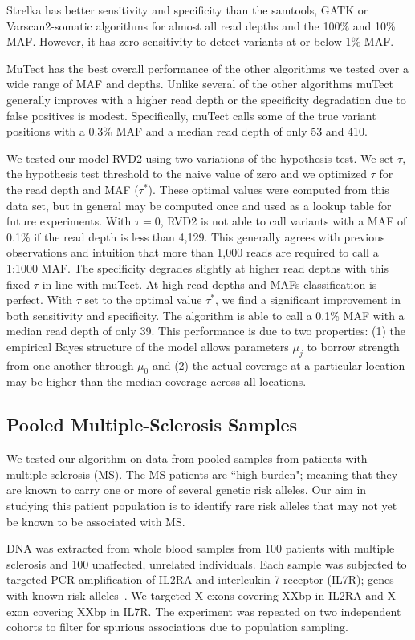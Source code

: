 \documentclass[11pt,reqno]{amsart}
\begin{document}
Strelka has better sensitivity and specificity than the samtools, GATK or Varscan2-somatic algorithms for almost all read depths and the 100\% and 10\% MAF. However, it has zero sensitivity to detect variants at or below 1\% MAF. 

MuTect has the best overall performance of the other algorithms we tested over a wide range of MAF and depths. Unlike several of the other algorithms muTect generally improves with a higher read depth or the specificity degradation due to false positives is modest. Specifically, muTect calls some of the true variant positions with a 0.3\% MAF and a median read depth of only 53 and 410.

We tested our model RVD2 using two variations of the hypothesis test. We set $\tau$, the hypothesis test threshold to the naive value of zero and we optimized $\tau$ for the read depth and MAF ($\tau^*$). These optimal values were computed from this data set, but in general may be computed once and used as a lookup table for future experiments. With $\tau=0$, RVD2 is not able to call variants with a MAF of 0.1\% if the read depth is less than 4,129. This generally agrees with previous observations and intuition that more than 1,000 reads are required to call a 1:1000 MAF. The specificity degrades slightly at higher read depths with this fixed $\tau$ in line with muTect. At high read depths and MAFs classification is perfect. With $\tau$ set to the optimal value $\tau^*$, we find a significant improvement in both sensitivity and specificity. The algorithm is able to call a 0.1\% MAF with a median read depth of only 39. This performance is due to two properties: (1) the empirical Bayes structure of the model allows parameters $\mu_j$ to borrow strength from one another through $\mu_0$ and (2) the actual coverage at a particular location may be higher than the median coverage across all locations.

\subsection{Pooled Multiple-Sclerosis Samples}

We tested our algorithm on data from pooled samples from patients with multiple-sclerosis (MS). The MS patients are ``high-burden"; meaning that they are known to carry one or more of several genetic risk alleles. Our aim in studying this  patient population is to identify rare risk alleles that may not yet be known to be associated with MS. 

DNA was extracted from whole blood samples from 100 patients with multiple sclerosis and 100 unaffected, unrelated individuals. Each sample was subjected to targeted PCR amplification of IL2RA and interleukin 7 receptor (IL7R); genes with known risk alleles~\cite{HauserNEJM2007}. We targeted X exons covering XXbp in IL2RA and X exon covering XXbp in IL7R. The experiment was repeated on two independent cohorts to filter for spurious associations due to population sampling.
\end{document}
